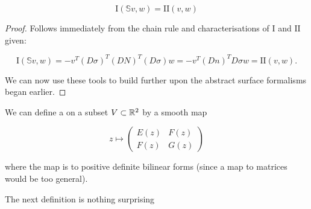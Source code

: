 \documentclass[11pt]{scrartcl}
\begin{document}
\begin{theorem}

\label{shape identity}

\begin{equation}
    \text{I}(\mathbb{S}v,w) = \text{II}(v,w)
\end{equation}

\begin{proof}

Follows immediately from the chain rule and characterisations of $\text{I}$ and $\text{II}$ given:

\begin{equation}
    \text{I} (\mathbb{S}v, w) = - v^T (D \sigma)^T (DN)^T (D \sigma) w = - v^T (Dn)^T D \sigma w = \text{II}(v,w).
\end{equation}

We can now use these tools to build further upon the abstract surface formalisms began earlier.


\end{proof}
\end{theorem}


\begin{definition}

We can define a  on a subset $V \subset \mathbb R^2$ by a smooth map

\begin{equation}
    z \mapsto \begin{pmatrix} E(z) & F(z) \\ F(z) & G(z) \end{pmatrix}
\end{equation}

where the map is to positive definite bilinear forms (since a map to matrices would be too general).
\label{rm1}
\end{definition}

The next definition is nothing surprising
\end{document}
